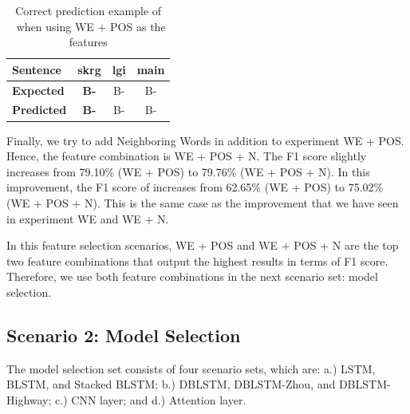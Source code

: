 \begin{table}
	\centering
	\caption{Correct prediction example of \timesrl~when using WE + POS as the features}
	\label{tab:timetrue}
	\begin{tabular}{|l|ccc|}
		\hline
		\textbf{Sentence} 				& skrg & lgi & main \\
		\hline
		\textbf{Expected}				& \textbf{B-\timesrl} & B-\modal & B-\predicate\\
		\hline
		\textbf{Predicted}		& \textbf{B-\timesrl} & B-\modal & B-\predicate \\
		\hline
	\end{tabular}
\end{table}

Finally, we try to add Neighboring Words in addition to experiment WE + POS. Hence, the feature combination is WE + POS + N. The F1 score slightly increases from 79.10\% (WE + POS) to 79.76\% (WE + POS + N). In this improvement, the F1 score of \greet increases from 62.65\% (WE + POS) to 75.02\% (WE + POS + N). This is the same case as the improvement that we have seen in experiment WE and WE + N. 


In this feature selection scenarios, WE + POS and WE + POS + N are the top two feature combinations that output the highest results in terms of F1 score. Therefore, we use both feature combinations in the next scenario set: model selection.

\subsection{Scenario 2: Model Selection}
The model selection set consists of four scenario sets, which are: a.) LSTM, BLSTM, and Stacked BLSTM; b.) DBLSTM, DBLSTM-Zhou, and DBLSTM-Highway; c.) CNN layer; and d.) Attention layer.

